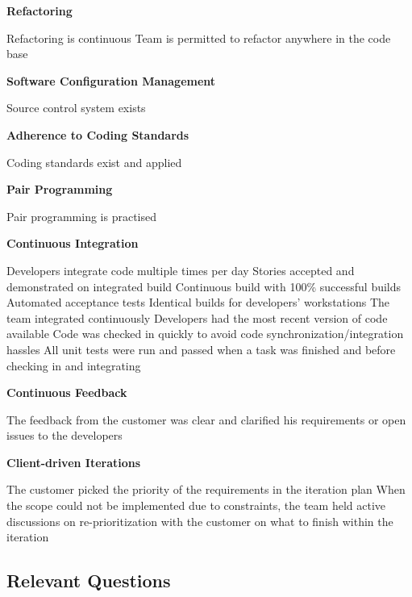 \textbf{Refactoring}
\begin{itemize}
	\taa Refactoring is continuous
	\taa Team is permitted to refactor anywhere in the code base
\end{itemize}

\textbf{Software Configuration Management}
\begin{itemize}
	\taa Source control system exists
\end{itemize}

\textbf{Adherence to Coding Standards}
\begin{itemize}
	\taa Coding standards exist and applied
\end{itemize}

\textbf{Pair Programming}
\begin{itemize}
	\taa Pair programming is practised
\end{itemize}

\textbf{Continuous Integration}
\begin{itemize}
	\taa Developers integrate code multiple times per day
	\taa Stories accepted and demonstrated on integrated build
	\taa Continuous build with 100\% successful builds
	\taa Automated acceptance tests
	\taa Identical builds for developers' workstations
	\pam The team integrated continuously
	\pam Developers had the most recent version of code available
	\pam Code was checked in quickly to avoid code synchronization/integration hassles
	\pam All unit tests were run and passed when a task was finished and before checking in and integrating 
\end{itemize}

\textbf{Continuous Feedback}
\begin{itemize}
	\pam The feedback from the customer was clear and clarified his requirements or open issues to the developers
\end{itemize}

\textbf{Client-driven Iterations}
\begin{itemize}
	\pam The customer picked the priority of the requirements in the iteration plan
	\pam When the scope could not be implemented due to constraints, the team held  active discussions on re-prioritization with the customer on what to finish within the iteration 
\end{itemize}

\subsection{Relevant Questions}

